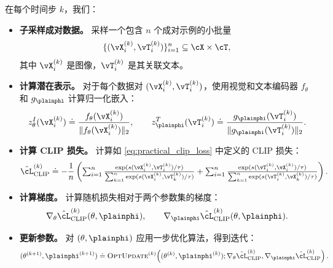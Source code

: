 \documentclass[../../book-main_zh.tex]{subfiles}
\begin{document}
在每个时间步 \(k\)，我们：
\begin{itemize}
    \item \textbf{子采样成对数据。} 采样一个包含 \(n\) 个成对示例的小批量
    \[
        \{(\vX_i^{(k)}, \vT_i^{(k)})\}_{i=1}^{n} \subseteq \cX \times \cT,
    \]
    其中 \(\vX_i^{(k)}\) 是图像，\(\vT_i^{(k)}\) 是其关联文本。

    \item \textbf{计算潜在表示。} 对于每个数据对 \((\vX_i^{(k)}, \vT_i^{(k)})\)，使用视觉和文本编码器 \(f_{\theta}\) 和 \(g_{\plainphi}\) 计算归一化嵌入：
    \begin{equation}
        z_{\theta}^{I}(\vX_i^{(k)}) \doteq \frac{f_{\theta}(\vX_i^{(k)})}{\|f_{\theta}(\vX_i^{(k)})\|_2},
        \qquad
        z_{\plainphi}^{T}(\vT_i^{(k)}) \doteq \frac{g_{\plainphi}(\vT_i^{(k)})}{\|g_{\plainphi}(\vT_i^{(k)})\|_2}.
    \end{equation}

    \item \textbf{计算 CLIP 损失。} 计算如 \eqref{eq:practical_clip_loss} 中定义的 CLIP 损失：
    \begin{equation}
        \hat{\cL}_{\text{CLIP}}^{(k)}
        \doteq
        -\frac{1}{n}\left(    
        \textstyle
        \sum_{i=1}^{n}
        \frac{\exp(s(\vX_i^{(k)},\vT_i^{(k)})/\tau)}{\sum_{k=1}^{n}\exp(s(\vX_i^{(k)},\vT_k^{(k)})/\tau)}
        +
        \sum_{i=1}^{n}
        \frac{\exp(s(\vT_i^{(k)},\vX_i^{(k)})/\tau)}{\sum_{k=1}^{n}\exp(s(\vT_i^{(k)},\vX_k^{(k)})/\tau)}
        \right).
    \end{equation}

    \item \textbf{计算梯度。} 计算随机损失相对于两个参数集的梯度：
    \begin{equation}
        \nabla_{\theta}\hat{\cL}_{\text{CLIP}}^{(k)}(\theta,\plainphi),
        \qquad
        \nabla_{\plainphi}\hat{\cL}_{\text{CLIP}}^{(k)}(\theta,\plainphi).
    \end{equation}

    \item \textbf{更新参数。} 对 \((\theta,\plainphi)\) 应用一步优化算法，得到迭代：
    \begin{equation}
        (\theta^{(k+1)}, \plainphi^{(k+1)})
        \doteq
        \textsc{OptUpdate}^{(k)}\!\left(
        (\theta^{(k)}, \plainphi^{(k)});
        \nabla_{\theta}\hat{\cL}_{\text{CLIP}}^{(k)},
        \nabla_{\plainphi}\hat{\cL}_{\text{CLIP}}^{(k)}
        \right).
    \end{equation}
\end{itemize}
\end{document}

